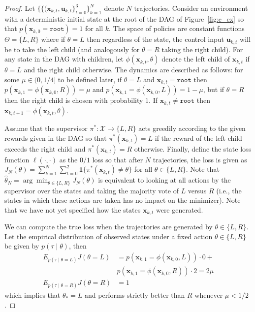 \documentclass[10pt, conference]{ieeeconf}      %
\newcommand{\bu}{\mathbf{u}}
\newcommand{\bx}{\mathbf{x}}
\begin{document}
\begin{proof}
Let $\{ \{ (\bx_{k,t},\bu_{k,t} \}_{t=0}^3 \}_{k=1}^N$ denote $N$ trajectories.
Consider an environment with a deterministic initial state at the root of the DAG of Figure~\ref{fig:c_ex} so that $p(\bx_{k,0} = \texttt{root}) = 1$ for all $k$. 
The space of policies are constant functions $\Theta = \{L,R\}$ where if $\theta=L$ then regardless of the state, the control input $\bu_{k,t}$ will be to take the left child (and analogously for $\theta=R$ taking the right child). 
For any state in the DAG with children, let $\phi(\bx_{k,t},\theta)$ denote the left child of $\bx_{k,t}$ if $\theta=L$ and the right child otherwise. 
The dynamics are described as follows: for some $\mu \in (0,1/4]$ to be defined later, if $\theta=L$ and $\bx_{k,t}=\texttt{root}$ then $p(\bx_{k,1}=\phi(\bx_{k,0},R))=\mu$ and $p(\bx_{k,1}=\phi(\bx_{k,0},L))=1-\mu$, but if $\theta=R$ then the right child is chosen with probability $1$. If $\bx_{k,t} \neq \texttt{root}$ then $\bx_{k,t+1} = \phi(\bx_{k,t},\theta)$.

Assume that the supervisor $\pi^*: \mathcal{X} \rightarrow \{L,R\}$ acts greedily according to the given rewards given in the DAG so that $\pi^*(\bx_{k,t})=L$ if the reward of the left child exceeds the right child and $\pi^*(\bx_{k,t})=R$ otherwise.
Finally, define the state loss function $\ell(\cdot,\cdot)$ as the $0/1$ loss so that after $N$ trajectories, the loss is given as $J_N(\theta)=\sum_{k=1}^N \sum_{t=0}^2 \mathbf{1}\{ \pi^*(\bx_{k,t}) \neq \theta \}$ for all $\theta \in \{L,R\}$. Note that $\widehat{\theta}_N = \arg\min_{\theta \in \{L,R\}} J_N(\theta)$ is equivalent to looking at all actions by the supervisor over the states and taking the majority vote of $L$ versus $R$ (i.e., the states in which these actions are taken has no impact on the minimizer). Note that we have not yet specified how the states $\bx_{k,t}$ were generated. 

We can compute the true loss when the trajectories are generated by $\theta \in \{L,R\}$. Let the empirical distribution of observed states under a fixed action $\theta \in \{L,R\}$ be given by $p(\tau \mid \theta)$, then
\begin{align*}
 E_{p(\tau \mid \theta=L) } J(\theta=L) &= p( \bx_{k,1} = \phi(\bx_{k,0},L) ) \cdot 0 +\\
 & p( \bx_{k,1} = \phi(\bx_{k,0},R) ) \cdot 2  = 2 \mu\\
   E_{p(\tau \mid \theta=R) } J(\theta=R) &= 1
\end{align*}
which implies that $\theta_* = L$ and performs strictly better than $R$ whenever $\mu < 1/2$.


\end{proof}
\end{document}
